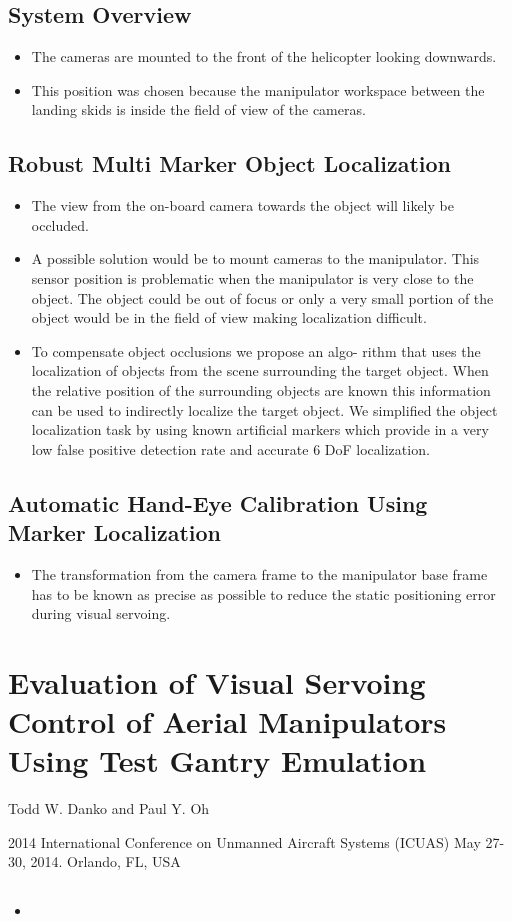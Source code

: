 \documentclass[a4paper, 11pt]{report}
\begin{document}
\subsection{System Overview}

\begin{itemize}
	\item The cameras are mounted to the front of the helicopter looking downwards.
	\item This position was chosen because the manipulator workspace between the landing skids is inside the field of view of the cameras.
\end{itemize}

\subsection{Robust Multi Marker Object Localization}

\begin{itemize}
	\item The view from the on-board camera towards the object will likely be occluded.
	\item A possible solution would be to mount cameras to the manipulator. This sensor position is problematic when the manipulator is very close to the object. The object could be out of focus or only a very small portion of the object would be in the field of view making localization difficult.
	\item To compensate object occlusions we propose an algo- rithm that uses the localization of objects from the scene surrounding the target object. When the relative position of the surrounding objects are known this information can be used to indirectly localize the target object. We simplified the object localization task by using known artificial markers which provide in a very low false positive detection rate and accurate 6 DoF localization.
\end{itemize}

\subsection{Automatic Hand-Eye Calibration Using Marker Localization}

\begin{itemize}
	\item The transformation from the camera frame to the manipulator base frame has to be known as precise as possible to reduce the static positioning error during visual servoing.
\end{itemize}

\section{Evaluation of Visual Servoing Control of Aerial Manipulators Using Test Gantry Emulation}

Todd W. Danko and Paul Y. Oh

2014 International Conference on Unmanned Aircraft Systems (ICUAS) 
May 27-30, 2014. Orlando, FL, USA

\subsection{}

\begin{itemize}
	\item
\end{itemize}
\end{document}
